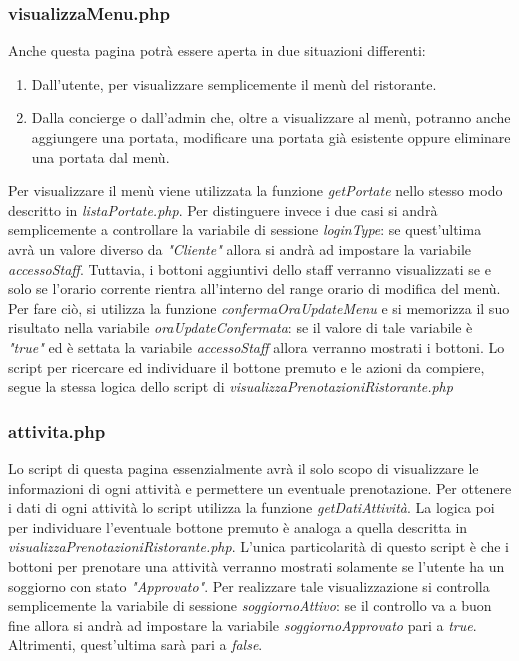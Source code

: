 \documentclass [a4paper, 12pt]{book}
\begin{document}
\subsubsection{visualizzaMenu.php}
Anche questa pagina potrà essere aperta in due situazioni differenti:
\begin{enumerate}
\item Dall'utente, per visualizzare semplicemente il menù del ristorante.
\item Dalla concierge o dall'admin che, oltre a visualizzare al menù, potranno anche aggiungere una portata, modificare una portata già esistente oppure eliminare una portata dal menù.
\end{enumerate}
Per visualizzare il menù viene utilizzata la funzione \textit{getPortate} nello stesso modo descritto in \textit{listaPortate.php}. Per distinguere invece i due casi si andrà semplicemente a controllare la variabile di sessione \textit{loginType}: se quest'ultima avrà un valore diverso da \textit{"Cliente"} allora si andrà ad impostare la variabile \textit{accessoStaff}. Tuttavia, i bottoni aggiuntivi dello staff verranno visualizzati se e solo se l'orario corrente rientra all'interno del range orario di modifica del menù. Per fare ciò, si utilizza la funzione \textit{confermaOraUpdateMenu} e si memorizza il suo risultato nella variabile \textit{oraUpdateConfermata}: se il valore di tale variabile è \textit{"true"} ed è settata la variabile  \textit{accessoStaff} allora verranno mostrati i bottoni. Lo script per ricercare ed individuare il bottone premuto e le azioni da compiere, segue la stessa logica dello script di \textit{visualizzaPrenotazioniRistorante.php}

\subsubsection{attivita.php}
Lo script di questa pagina essenzialmente avrà il solo scopo di visualizzare le informazioni di ogni attività e permettere un eventuale prenotazione. Per ottenere i dati di ogni attività lo script utilizza la funzione \textit{getDatiAttività}. La logica poi per individuare l'eventuale bottone premuto è analoga a quella descritta in \textit{visualizzaPrenotazioniRistorante.php}. L'unica particolarità di questo script è che i bottoni per prenotare una attività verranno mostrati solamente se l'utente ha un soggiorno con stato \textit{"Approvato"}. Per realizzare tale visualizzazione si controlla semplicemente la variabile di sessione \textit{soggiornoAttivo}: se il controllo va a buon fine allora si andrà ad impostare la variabile \textit{soggiornoApprovato} pari a \textit{true}. Altrimenti, quest'ultima sarà pari a \textit{false}.
\end{document}
